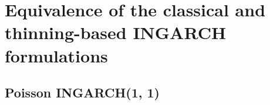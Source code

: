 \documentclass{article}
\begin{document}
%
%
%
%


\appendix
\section{Equivalence of the classical and thinning-based INGARCH formulations}
\label{appendix:proof}

\subsection{Poisson INGARCH(1, 1)}
\label{subsec:derivation_poisson11}
\end{document}
